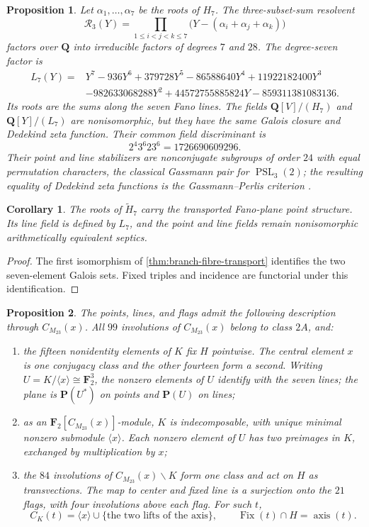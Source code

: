 \documentclass[11pt]{amsart}
\newtheorem{proposition}[proposition]{Proposition}
\newtheorem{corollary}[corollary]{Corollary}
\theoremstyle{definition}
\theoremstyle{remark}
\newcommand{\QQ}{\mathbf Q}
\newcommand{\FF}{\mathbf F}
\newcommand{\PP}{\mathbf P}
\newcommand{\PSL}{\operatorname{PSL}}
\newcommand{\Fix}{\operatorname{Fix}}
\newcommand{\Cx}{C_{M_{23}}(x)}
\begin{document}
\begin{proposition}\label{prop:linefield}
Let $\alpha_1,\ldots,\alpha_7$ be the roots of $H_7$.  The three-subset-sum
resolvent
\[
 \mathcal R_3(Y)=\prod_{1\leq i<j<k\leq7}
 \bigl(Y-(\alpha_i+\alpha_j+\alpha_k)\bigr)
\]
factors over $\QQ$ into irreducible factors of degrees $7$ and $28$.  The
degree-seven factor is
\[
\begin{aligned}
L_7(Y)={}&Y^7-936Y^6+379728Y^5-86588640Y^4
 +11922182400Y^3\\
&-982633068288Y^2+44572755885824Y-859311381083136.
\end{aligned}
\]
Its roots are the sums along the seven Fano lines.  The fields
$\QQ[V]/(H_7)$ and $\QQ[Y]/(L_7)$ are nonisomorphic, but they have the same
Galois closure and Dedekind zeta function.  Their common field discriminant
is
\[
 2^4 3^6 23^6=1726690609296.
\]
Their point and line stabilizers are nonconjugate subgroups of order $24$
with equal permutation characters, the classical Gassmann pair for
$\PSL_3(2)$; the resulting equality of Dedekind zeta functions is the
Gassmann--Perlis criterion \cite{Perlis}.
\end{proposition}

\begin{corollary}\label{cor:fano}
The roots of $\widetilde H_7$ carry the transported Fano-plane point
structure.  Its line field is defined by $L_7$, and the point and line fields
remain nonisomorphic arithmetically equivalent septics.
\end{corollary}

\begin{proof}
The first isomorphism of \cref{thm:branch-fibre-transport} identifies the
two seven-element
Galois sets.  Fixed triples and incidence are functorial under this
identification.
\end{proof}

\smallskip
\begin{proposition}\label{prop:centralizer-fano}
The points, lines, and flags admit the following description through
$\Cx$.  All $99$ involutions of $\Cx$ belong to class $2A$,
and:
\begin{enumerate}
\item the fifteen nonidentity elements of $K$ fix $H$ pointwise.  The
  central element $x$ is one conjugacy class and the other fourteen form a
  second.  Writing $U=K/\langle x\rangle\cong\FF_2^3$, the nonzero elements
  of $U$ identify with the seven lines; the plane is $\PP(U^*)$ on points
  and $\PP(U)$ on lines;
\item as an $\FF_2[\Cx]$-module, $K$ is indecomposable, with unique minimal
  nonzero submodule $\langle x\rangle$.  Each nonzero element of $U$ has two
  preimages in $K$, exchanged by multiplication by $x$;
\item the $84$ involutions of $\Cx\smallsetminus K$ form one class and act
  on $H$ as transvections.  The map to center and fixed line is a surjection
  onto the $21$ flags, with four involutions above each flag.  For such $t$,
  \[
   C_K(t)=\langle x\rangle\cup\{\text{the two lifts of the axis}\},
   \qquad \Fix(t)\cap H=\operatorname{axis}(t).
  \]
\end{enumerate}
\end{proposition}
\end{document}
